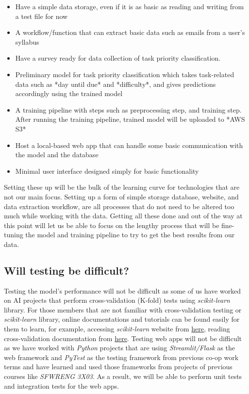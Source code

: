 \documentclass{article}
\begin{document}
    \begin{itemize}
        \item Have a simple data storage, even if it is as basic as reading and writing from a test file for now
        \item A workflow/function that can extract basic data such as emails from a user's syllabus
        \item Have a survey ready for data collection of task priority classification. 
        \item Preliminary model for task priority classification which takes task-related data such as *day until due* and *difficulty*, and gives predictions accordingly using the trained model
        \item A training pipeline with steps such as preprocessing step, and training step. After running the training pipeline, trained model will be uploaded to *AWS S3*
        \item Host a local-based web app that can handle some basic communication with the model and the database 
        \item Minimal user interface designed simply for basic functionality
    \end{itemize}
    Setting these up will be the bulk of the learning curve for technologies that are not our main focus. Setting up a form of simple storage database, website, and data extraction workflow, are all processes that do not need to be altered too much while working with the data. Getting all these done and out of the way at this point will let us be able to focus on the lengthy process that will be fine-tuning the model and training pipeline to try to get the best results from our data.

    \subsection*{Will testing be difficult?}
    Testing the model's performance will not be difficult as some of us have worked on AI projects that perform cross-validation (K-fold) tests using \textit{scikit-learn} library. For those members that are not familiar with cross-validation testing or \textit{scikit-learn} library, online documentations and tutorials can be found easily for them to learn, for example, accessing \textit{scikit-learn} website from \href{https://scikit-learn.org/stable/index.html}{here}, reading cross-validation documentation from \href{https://scikit-learn.org/stable/modules/cross_validation.html}{here}.
    Testing web apps will not be difficult as we have worked with \textit{Python} projects that are using \textit{Streamlit/Flask} as the web framework and \textit{PyTest} as the testing framework from previous co-op work terms and have learned and used those frameworks from projects of previous courses like \textit{SFWRENG 3X03}. As a result, we will be able to perform unit tests and integration tests for the web apps. 
\end{document}

